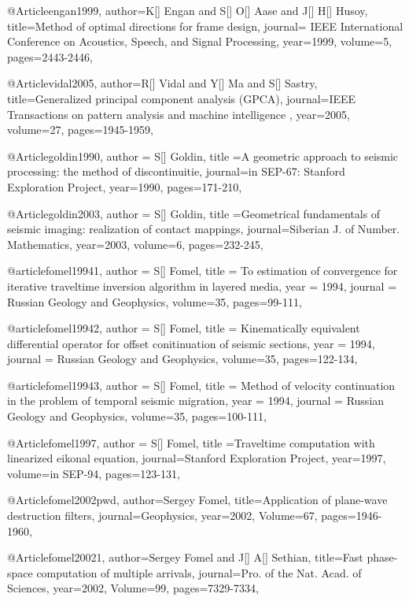 @Article{engan1999,
  author={K[] Engan and S[] O[] Aase and J[] H[] Husoy},
  title={Method of optimal directions for frame design},
  journal={ IEEE International Conference on Acoustics, Speech, and Signal Processing},
  year=1999,
  volume=5,
  pages={2443-2446},
}

@Article{vidal2005,
  author={R[] Vidal and Y[] Ma and S[] Sastry},
  title={Generalized principal component analysis (GPCA)},
  journal={IEEE Transactions on pattern analysis and machine intelligence
},
  year=2005,
  volume=27,
  pages={1945-1959},
}

@Article{goldin1990,
  author = {S[] Goldin},
  title ={A geometric approach to seismic processing: the method of discontinuitie},
  journal={in SEP-67: Stanford Exploration Project},
  year=1990,
  pages={171-210},
}

@Article{goldin2003,
  author = {S[] Goldin},
  title ={Geometrical fundamentals of seismic imaging: realization of contact mappings},
  journal={Siberian J. of Number. Mathematics},
  year=2003,
  volume=6,
  pages={232-245},
}

@article{fomel19941,
  author =	 {S[] Fomel},
  title =	 {To estimation of convergence for iterative traveltime inversion algorithm in layered media},
  year =	 1994,
  journal =	 {Russian Geology and Geophysics},
  volume={35},
 pages=99-111,
}

@article{fomel19942,
  author =	 {S[] Fomel},
  title =	 {Kinematically equivalent differential operator for offset conitinuation of seismic sections},
  year =	 1994,
  journal =	 {Russian Geology and Geophysics},
  volume={35},
 pages=122-134,
}

@article{fomel19943,
  author =	 {S[] Fomel},
  title =	 {Method of velocity continuation in the problem of temporal seismic migration},
  year =	 1994,
  journal =	 {Russian Geology and Geophysics},
  volume={35},
 pages=100-111,
}

@Article{fomel1997,
  author = {S[] Fomel},
  title ={Traveltime computation with linearized eikonal equation},
  journal={Stanford Exploration Project},
  year=1997,
  volume={in SEP-94},
  pages={123-131},
}

@Article{fomel2002pwd,
  author={Sergey Fomel},
  title={Application of plane-wave destruction filters},
  journal={Geophysics},
  year=2002,
  Volume=67,
  pages={1946-1960},
}



@Article{fomel20021,
  author={Sergey Fomel and J[] A[] Sethian},
  title={Fast phase-space computation of multiple arrivals},
  journal={Pro. of the Nat. Acad. of Sciences},
  year=2002,
  Volume=99,
  pages={7329-7334},
}



